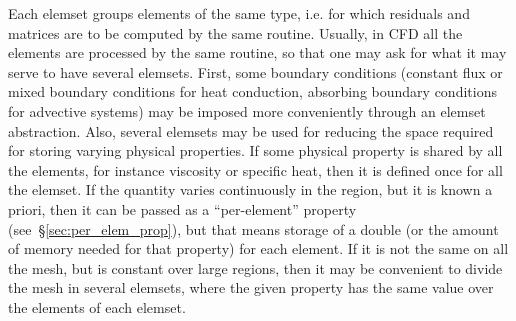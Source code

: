 Each elemset groups elements of the same type, i.e. for which
residuals and matrices are to be computed by the same routine.
Usually, in CFD all the elements are processed by the same routine, so
that one may ask for what it may serve to have several elemsets.
First, some boundary conditions (constant flux or mixed boundary
conditions for heat conduction, absorbing boundary conditions for
advective systems) may be imposed more conveniently through an elemset
abstraction.  Also, several elemsets may be used for reducing the
space required for storing varying physical properties.  If some
physical property is shared by all the elements, for instance
viscosity or specific heat, then it is defined once for all the
elemset. If the quantity varies continuously in the region, but it is
known a priori, then it can be passed as a ``per-element'' property
(see~\S\ref{sec:per_elem_prop}), but that means storage of a double
(or the amount of memory needed for that property) for each
element. If it is not the same on all the mesh, but is constant over
large regions, then it may be convenient to divide the mesh in several
elemsets, where the given property has the same value over the
elements of each elemset.


